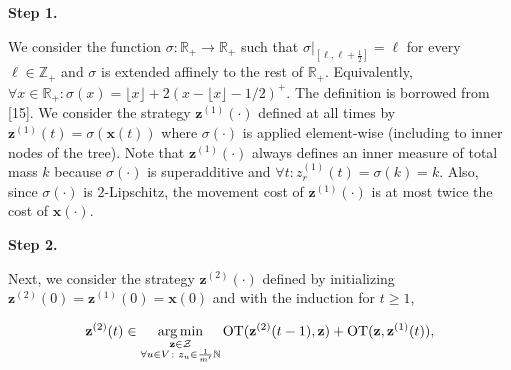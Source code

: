 \par\medskip\noindent\textbf{Step 1.}\par




We consider the function $\sigma\colon\mathbb{R}_{+}\rightarrow\mathbb{R}_{+}$ such that $\sigma|_{\left[\ell,\ell+\frac{1}{2}\right]}=\ell$ for every $\ell\in\mathbb{Z}_{+}$ and $\sigma$ is extended affinely to the rest of $\mathbb{R}_{+}$. Equivalently, $\forall x\in\mathbb{R}_{+}\colon\sigma(x)={\lfloor x\rfloor}+2(x-{\lfloor x\rfloor}-1/2)^{+}$. The definition is borrowed from [15]. We consider the strategy ${\mathbf{z}}^{(1)}(\cdot)$ defined at all times by ${\mathbf{z}}^{(1)}(t)=\sigma({\boldsymbol{x}}(t))$ where $\sigma(\cdot)$ is applied element-wise (including to inner nodes of the tree). Note that ${\mathbf{z}}^{(1)}(\cdot)$ always defines an inner measure of total mass $k$ because $\sigma(\cdot)$ is superadditive and $\forall t\colon z^{(1)}_{r}(t)=\sigma(k)=k$. Also, since $\sigma(\cdot)$ is $2$-Lipschitz, the movement cost of ${\mathbf{z}}^{(1)}(\cdot)$ is at most twice the cost of ${\boldsymbol{x}}(\cdot)$.\par





\par\medskip\noindent\textbf{Step 2.}\par




Next, we consider the strategy ${\mathbf{z}}^{(2)}(\cdot)$ defined by initializing ${\mathbf{z}}^{(2)}(0)={\mathbf{z}}^{(1)}(0)={\boldsymbol{x}}(0)$ and with the induction for $t\geq 1$,\par


\[\begin{gathered}
{\mathbf{z}}^{(2)}(t)\in\operatorname*{arg\,min}_{\begin{subarray}{c}{\mathbf{z}}\in\mathcal{Z}\\
\forall u\in V\colon z_{u}\in\frac{1}{m^{\prime}}\mathbb{N}\end{subarray}}\text{OT}({\mathbf{z}}^{(2)}(t-1),{\mathbf{z}})+\text{OT}({\mathbf{z}},{\mathbf{z}}^{(1)}(t)),
\end{gathered}\]


